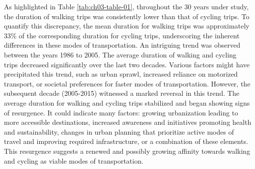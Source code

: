 \documentclass[
11pt, %
oneside, %
english, %
singlespacing, %
]{macthesis} %
\begin{document}
As highlighted in Table \ref{tab:ch03-table-01}, throughout the 30 years under study, the duration of walking trips was consistently lower than that of cycling trips. To quantify this discrepancy, the mean duration for walking trips was approximately 33\% of the corresponding duration for cycling trips, underscoring the inherent differences in these modes of transportation. An intriguing trend was observed between the years 1986 to 2005. The average duration of walking and cycling trips decreased significantly over the last two decades. Various factors might have precipitated this trend, such as urban sprawl, increased reliance on motorized transport, or societal preferences for faster modes of transportation. However, the subsequent decade (2005-2015) witnessed a marked reversal in this trend. The average duration for walking and cycling trips stabilized and began showing signs of resurgence. It could indicate many factors: growing urbanization leading to more accessible destinations, increased awareness and initiatives promoting health and sustainability, changes in urban planning that prioritize active modes of travel and improving required infrastructure, or a combination of these elements. This resurgence suggests a renewed and possibly growing affinity towards walking and cycling as viable modes of transportation.

\begingroup\fontsize{6}{8}\selectfont
\end{document}
